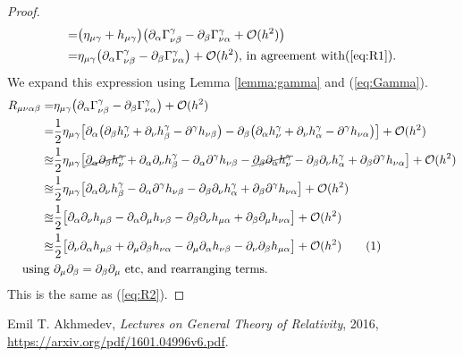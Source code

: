 \documentclass[]{article}
\newcommand\numberthis{\addtocounter{equation}{1}\tag{\theequation}}
\begin{document}
\begin{proof}
\begin{align*}
	=&\big(\eta_{\mu\gamma}+h_{\mu\gamma}\big) \big(\partial_{\alpha}\Gamma^{\gamma}_{\nu\beta} - \partial_{\beta}\Gamma^{\gamma}_{\nu\alpha} + \mathcal{O}(h^2)\big)\\
	=&\eta_{\mu\gamma}\big(\partial_{\alpha}\Gamma^{\gamma}_{\nu\beta} - \partial_{\beta}\Gamma^{\gamma}_{\nu\alpha} \big)+ \mathcal{O}(h^2)\text{, in agreement with(\ref{eq:R1}).}
	\end{align*}
	We expand this expression using Lemma \ref{lemma:gamma} and (\ref{eq:Gamma}).
	\begin{align*}
	R_{\mu\nu\alpha\beta} =&\eta_{\mu\gamma}\big(\partial_{\alpha}\Gamma^{\gamma}_{\nu\beta} - \partial_{\beta}\Gamma^{\gamma}_{\nu\alpha} \big)+ \mathcal{O}(h^2)\\
	=&\frac{1}{2}\eta_{\mu\gamma}\big[\partial_{\alpha}\big( \partial_{\beta}h^{\gamma}_{\nu} + \partial_{\nu}h^{\gamma}_{\beta}-\partial^{\gamma}h_{\nu\beta}  \big) - \partial_{\beta}\big( \partial_{\alpha}h^{\gamma}_{\nu}+\partial_{\nu}h^{\gamma}_{\alpha}-\partial^{\gamma}h_{\nu\alpha}  \big)\big]+ \mathcal{O}(h^2)\\
	\approxeq&\frac{1}{2}\eta_{\mu\gamma}\big[\cancel{\partial_{\alpha}\partial_{\beta}h^{\gamma}_{\nu}} + \partial_{\alpha}\partial_{\nu}h^{\gamma}_{\beta}-\partial_{\alpha}\partial^{\gamma}h_{\nu\beta}  -  \cancel{\partial_{\beta}\partial_{\alpha}h^{\gamma}_{\nu}}-\partial_{\beta}\partial_{\nu}h^{\gamma}_{\alpha}+\partial_{\beta}\partial^{\gamma}h_{\nu\alpha}  \big]+ \mathcal{O}(h^2)\\
	\approxeq&\frac{1}{2}\eta_{\mu\gamma}\big[ \partial_{\alpha}\partial_{\nu}h^{\gamma}_{\beta}-\partial_{\alpha}\partial^{\gamma}h_{\nu\beta}  -\partial_{\beta}\partial_{\nu}h^{\gamma}_{\alpha}+\partial_{\beta}\partial^{\gamma}h_{\nu\alpha}  \big]+ \mathcal{O}(h^2)
	\\
	\approxeq&\frac{1}{2}\big[ \partial_{\alpha}\partial_{\nu}h_{\mu\beta}-\partial_{\alpha}\partial_{\mu}h_{\nu\beta}  -\partial_{\beta}\partial_{\nu}h_{\mu\alpha}+\partial_{\beta}\partial_{\mu}h_{\nu\alpha}  \big]+ \mathcal{O}(h^2)\\
	\approxeq&\frac{1}{2}\big[\partial_{\nu}\partial_{\alpha}h_{\mu\beta} + \partial_{\mu}\partial_{\beta}h_{\nu\alpha} - \partial_{\mu}\partial_{\alpha}h_{\nu\beta} - \partial_{\nu}\partial_{\beta}h_{\mu\alpha}\big]+ \mathcal{O}(h^2) \numberthis\label{eq:R}\\
	\text{using }& \partial_{\mu}\partial_{\beta}=\partial_{\beta}\partial_{\mu} \text{ etc, and rearranging terms.}
	\end{align*}
	This is the same as (\ref{eq:R2}).
\end{proof}

\begin{thebibliography}{9}
	
	Emil T. Akhmedev,
	\emph{Lectures on General Theory of Relativity},
	2016,
	\url{https://arxiv.org/pdf/1601.04996v6.pdf}.
	
	
\end{thebibliography}
\end{document}

